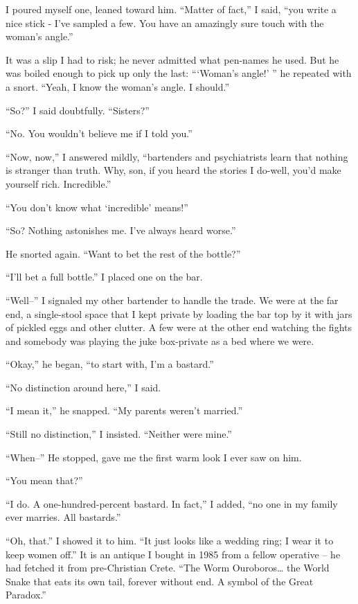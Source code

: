 I  poured  myself  one, leaned toward him. ``Matter of
fact,'' I said, ``you write a nice stick - I've sampled  a  few.
You have an amazingly sure touch with the woman's angle.''

It  was  a  slip I had to risk; he never admitted what
pen-names he used. But he was boiled enough to pick up only the
last: ```Woman's angle!' '' he repeated with a snort. ``Yeah,  I
know the woman's angle. I should.''

``So?'' I said doubtfully. ``Sisters?''

``No. You wouldn't believe me if I told you.''

``Now, now,''  I  answered  mildly,  ``bartenders  and
psychiatrists learn that nothing is stranger than  truth.  Why,
son,  if  you  heard the stories I do-well, you'd make yourself
rich. Incredible.''

``You don't know what `incredible' means!''

``So? Nothing astonishes me. I've always heard worse.''

He snorted again. ``Want  to  bet  the  rest  of  the
bottle?''

``I'll bet a full bottle.'' I placed one on the bar.

``Well--'' I signaled  my  other bartender to handle the
trade. We were at the far end, a single-stool space that I kept
private by loading the bar top by it with jars of pickled  eggs
and  other  clutter.  A  few were at the other end watching the
fights and somebody was playing the juke box-private as  a  bed
where we were.

``Okay,'' he began, ``to start with, I'm a bastard.''

``No distinction around here,'' I said.

``I  mean  it,''  he  snapped. ``My  parents weren't married.''

``Still no distinction,'' I insisted. ``Neither  were mine.''

``When--'' He stopped, gave me the first warm look I ever saw on him.

``You mean that?''

``I do. A one-hundred-percent  bastard.  In  fact,''  I added, ``no one in my
family ever marries. All bastards.''

``Oh, that.'' I showed it to him. ``It just looks like
a wedding  ring;  I  wear  it  to  keep  women off.'' It is an
antique I bought in 1985 from  a  fellow  operative  --  he  had
fetched  it  from pre-Christian Crete. ``The Worm Ouroboros\dots
the World Snake that eats its own tail, forever without end.  A
symbol of the Great Paradox.''

